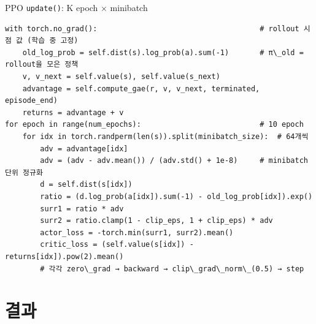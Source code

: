 \documentclass[aspectratio=169,11pt,xcolor=table]{beamer}
\newcommand{\cc}[1]{\texttt{#1}}
\begin{document}
\begin{frame}[fragile]{PPO \cc{update()}: K epoch × minibatch}
\begin{lstlisting}
with torch.no_grad():                                     # rollout 시점 값 (학습 중 고정)
    old_log_prob = self.dist(s).log_prob(a).sum(-1)       # π\_old = rollout을 모은 정책
    v, v_next = self.value(s), self.value(s_next)
    advantage = self.compute_gae(r, v, v_next, terminated, episode_end)
    returns = advantage + v
for epoch in range(num_epochs):                           # 10 epoch
    for idx in torch.randperm(len(s)).split(minibatch_size):  # 64개씩
        adv = advantage[idx]
        adv = (adv - adv.mean()) / (adv.std() + 1e-8)     # minibatch 단위 정규화
        d = self.dist(s[idx])
        ratio = (d.log_prob(a[idx]).sum(-1) - old_log_prob[idx]).exp()
        surr1 = ratio * adv
        surr2 = ratio.clamp(1 - clip_eps, 1 + clip_eps) * adv
        actor_loss = -torch.min(surr1, surr2).mean()
        critic_loss = (self.value(s[idx]) - returns[idx]).pow(2).mean()
        # 각각 zero\_grad → backward → clip\_grad\_norm\_(0.5) → step
\end{lstlisting}
\end{frame}

\section{결과}
\end{document}
